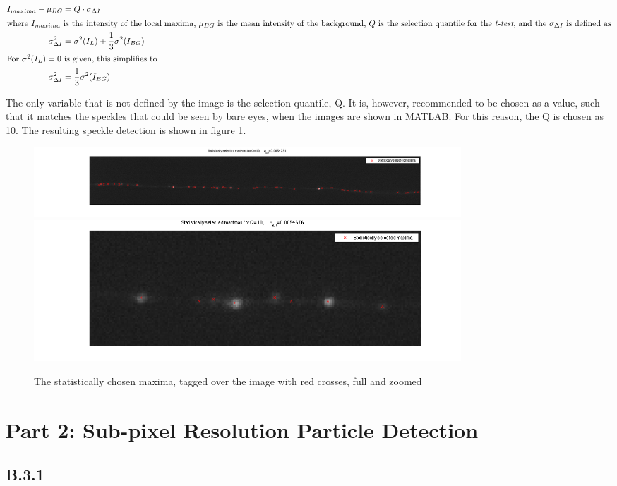 \documentclass{article}
\begin{document}
\begin{align}
I_{maxima} - \mu_{BG} &= Q\cdot \sigma_{\Delta I}\\
\intertext{where $I_{maxima}$ is the intensity of the local maxima, $\mu_{BG}$ is the mean intensity of the background, $Q$ is the selection quantile for the \emph{t-test}, and the $\sigma_{\Delta I}$ is defined as}
\sigma^2_{\Delta I} &= \sigma^2(I_L) + \frac{1}{3}\sigma^2(I_{BG}) \nonumber \\
\intertext{For $\sigma^2(I_L)=0$ is given, this simplifies to}
\sigma^2_{\Delta I} &= \frac{1}{3}\sigma^2(I_{BG})
\end{align}

The only variable that is not defined by the image is the selection quantile, Q. It is, however, recommended to be chosen as a value, such that it matches the speckles that could be seen by bare eyes, when the images are shown in MATLAB. For this reason, the Q is chosen as 10. The resulting speckle detection is shown in figure \ref{fig:statMax}.

\begin{figure}[H]
\centering
\includegraphics[width=16cm]{figures/statistics_maxima_full.png}
\includegraphics[width=16cm]{figures/statistics_maxima_zoom.png}
\caption{The statistically chosen maxima, tagged over the image with red crosses,
    full and zoomed}
\label{fig:statMax}
\end{figure}
 


\pagebreak
\section*{Part 2: Sub-pixel Resolution Particle Detection}

\subsection*{B.3.1}
\end{document}
